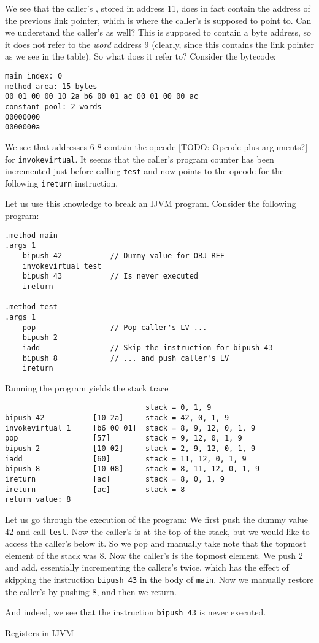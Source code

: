 \documentclass[article, a4paper, 11pt, oneside]{memoir}
\numberwithin{equation}{chapter}
\newcommand{\inlinecode}[1]{\colorbox{lightgray}{\vphantom{\texttt{jk}}\lstinline$#1$}}
\renewcommand{\inlinecode}{\lstinline}
\begin{document}
\begin{notelist}
We see that the caller's , stored in address 11, does in fact contain the address of the previous link pointer, which is where the caller's  is supposed to point to. Can we understand the caller's  as well? This is supposed to contain a byte address, so it does not refer to the \emph{word} address 9 (clearly, since this contains the link pointer as we see in the table). So what does it refer to? Consider the bytecode:
%
\begin{lstlisting}
main index: 0
method area: 15 bytes
00 01 00 00 10 2a b6 00 01 ac 00 01 00 00 ac 
constant pool: 2 words
00000000
0000000a
\end{lstlisting}
%
We see that addresses 6-8 contain the opcode [TODO: Opcode plus arguments?] for \inlinecode{invokevirtual}. It seems that the caller's program counter has been incremented just before calling \inlinecode{test} and now points to the opcode for the following \inlinecode{ireturn} instruction.

Let us use this knowledge to break an IJVM program. Consider the following program:
%
\begin{lstlisting}
.method main
.args 1
    bipush 42           // Dummy value for OBJ_REF
    invokevirtual test
    bipush 43           // Is never executed
    ireturn

.method test
.args 1
    pop                 // Pop caller's LV ...
    bipush 2
    iadd                // Skip the instruction for bipush 43
    bipush 8            // ... and push caller's LV
    ireturn
\end{lstlisting}
%
Running the program yields the stack trace
%
\begin{lstlisting}
                                stack = 0, 1, 9
bipush 42           [10 2a]     stack = 42, 0, 1, 9
invokevirtual 1     [b6 00 01]  stack = 8, 9, 12, 0, 1, 9
pop                 [57]        stack = 9, 12, 0, 1, 9
bipush 2            [10 02]     stack = 2, 9, 12, 0, 1, 9
iadd                [60]        stack = 11, 12, 0, 1, 9
bipush 8            [10 08]     stack = 8, 11, 12, 0, 1, 9
ireturn             [ac]        stack = 8, 0, 1, 9
ireturn             [ac]        stack = 8
return value: 8
\end{lstlisting}
%
Let us go through the execution of the program: We first push the dummy value 42 and call \inlinecode{test}. Now the caller's  is at the top of the stack, but we would like to access the caller's  below it. So we pop and manually take note that the topmost element of the stack was 8. Now the caller's  is the topmost element. We push 2 and add, essentially incrementing the callers's  twice, which has the effect of skipping the instruction \inlinecode{bipush 43} in the body of \inlinecode{main}. Now we manually restore the caller's  by pushing 8, and then we return.

And indeed, we see that the instruction \inlinecode{bipush 43} is never executed.

\item[Registers in IJVM]

\end{notelist}
\end{document}
